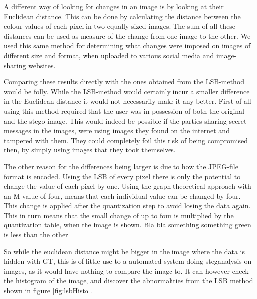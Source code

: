 A different way of looking for changes in an image is by looking at their Euclidean distance.
This can be done by calculating the distance between the colour values of each pixel in two equally sized images.
The sum of all these distances can be used as measure of the change from one image to the other.
We used this same method for determining what changes were imposed on images of different size and format, when uploaded to various social media and image-sharing websites.

Comparing these results directly with the ones obtained from the LSB-method would be folly.
While the LSB-method would certainly incur a smaller difference in the Euclidean distance it would not necessarily make it any better.
First of all using this method required that the user was in possession of both the original and the stego image.
This would indeed be possible if the parties sharing secret messages in the images, were using images they found on the internet and tampered with them.
They could completely foil this risk of being compromised then, by simply using images that they took themselves.

The other reason for the differences being larger is due to how the JPEG-file format is encoded.
Using the LSB of every pixel there is only the potential to change the value of each pixel by one.
Using the graph-theoretical approach with an M value of four, means that each individual value can be changed by four. 
This change is applied after the quantization step to avoid losing the data again.
This in turn means that the small change of up to four is multiplied by the quantization table, when the image is shown.
Bla bla something something green is less than the other

So while the euclidean distance might be bigger in the image where the data is hidden with GT, this is of little use to a automated system doing steganalysis on images, as it would have nothing to compare the image to. It can however check the histogram of the image, and discover the abnormalities from the LSB method shown in figure \ref{fig:lsbHisto}. 
